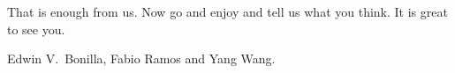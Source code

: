 {That is enough from us. Now go and enjoy \mlss  and tell us what you think. It is great to see you.






\bigskip

Edwin V.~Bonilla, Fabio Ramos and Yang Wang.


}
